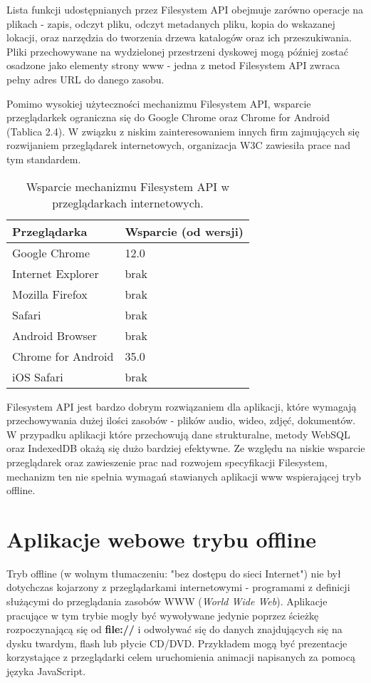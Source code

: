 Lista funkcji udostępnianych przez Filesystem API obejmuje zarówno operacje na plikach - zapis, odczyt pliku, odczyt metadanych pliku, kopia do wskazanej lokacji, oraz narzędzia do tworzenia drzewa katalogów oraz ich przeszukiwania. Pliki przechowywane na wydzielonej przestrzeni dyskowej mogą później zostać osadzone jako elementy strony www - jedna z metod Filesystem API zwraca pełny adres URL do danego zasobu.

Pomimo wysokiej użyteczności mechanizmu Filesystem API, wsparcie przeglądarkek ograniczna się do Google Chrome oraz Chrome for Android (Tablica 2.4). W związku z niskim zainteresowaniem innych firm zajmujących się rozwijaniem przeglądarek internetowych, organizacja W3C zawiesiła prace nad tym standardem.

\begin{table}[h]
\centering
    \begin{tabular}{ | p{8cm} | p{6cm} | }
    \hline
    \textbf{Przeglądarka} & \textbf{Wsparcie (od wersji)} \\ \hline
	Google Chrome & 12.0
	\\ \hline
	Internet Explorer & brak
	\\ \hline
	Mozilla Firefox & brak
	\\ \hline
	Safari & brak
	\\ \hline
	Android Browser & brak
	\\ \hline
	Chrome for Android & 35.0
	\\ \hline
	iOS Safari & brak
	\\ \hline
    \end{tabular}
	\caption{Wsparcie mechanizmu Filesystem API w przeglądarkach internetowych.}
\end{table}

Filesystem API jest bardzo dobrym rozwiązaniem dla aplikacji, które wymagają przechowywania dużej ilości zasobów - plików audio, wideo, zdjęć, dokumentów. W przypadku aplikacji które przechowują dane strukturalne, metody WebSQL oraz IndexedDB okażą się dużo bardziej efektywne. Ze względu na niskie wsparcie przeglądarek oraz zawieszenie prac nad rozwojem specyfikacji Filesystem, mechanizm ten nie spełnia wymagań stawianych aplikacji www wspierającej tryb offline.

\section{Aplikacje webowe trybu offline}
\label{sec:appWebOff}

Tryb offline\cite{whatOffline} (w wolnym tłumaczeniu: "bez dostępu do sieci Internet") nie był dotychczas kojarzony z przeglądarkami internetowymi - programami z definicji służącymi do przeglądania zasobów WWW (\emph{World Wide Web}). Aplikacje pracujące w tym trybie mogły być wywoływane jedynie poprzez ścieżkę rozpoczynającą się od \textbf{file://} i odwoływać się do danych znajdujących się na dysku twardym, flash lub płycie CD/DVD. Przykładem mogą być prezentacje korzystające z przeglądarki celem uruchomienia animacji napisanych za pomocą języka JavaScript.

